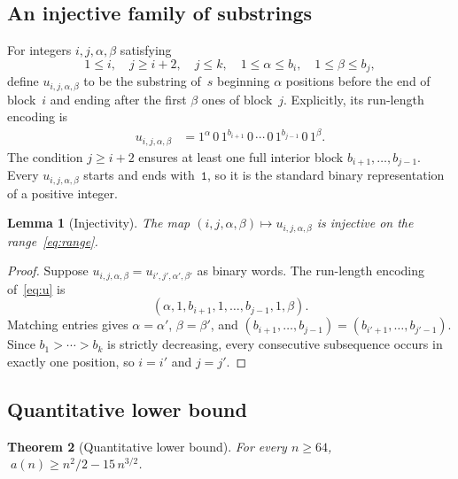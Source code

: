 \documentclass[11pt,a4paper]{article}
\theoremstyle{plain}
\newtheorem{theorem}{Theorem}[section]
\newtheorem{lemma}[theorem]{Lemma}
\theoremstyle{definition}
\theoremstyle{remark}
\begin{document}
\subsection{An injective family of substrings}

For integers $i, j, \alpha, \beta$ satisfying
\begin{equation}\label{eq:range}
  1 \le i, \quad j \ge i + 2, \quad j \le k, \quad
  1 \le \alpha \le b_i, \quad 1 \le \beta \le b_j,
\end{equation}
define $u_{i,j,\alpha,\beta}$ to be the substring of~$s$ beginning
$\alpha$ positions before the end of block~$i$ and ending after the
first $\beta$ ones of block~$j$.  Explicitly, its run-length encoding is
\begin{equation}\label{eq:u}
  \begin{aligned}
  u_{i,j,\alpha,\beta}
  &= 1^{\alpha}\,0\,1^{b_{i+1}}\,0\,\cdots\,0\,
     1^{b_{j-1}}\,0\,1^{\beta}.
  \end{aligned}
\end{equation}
The condition $j \ge i + 2$ ensures at least one full interior block
$b_{i+1},\ldots,b_{j-1}$.  Every $u_{i,j,\alpha,\beta}$ starts and
ends with~$\mathtt{1}$, so it is the standard binary representation of
a positive integer.

\begin{lemma}[Injectivity]\label{lem:inject}
  The map $(i,j,\alpha,\beta) \mapsto u_{i,j,\alpha,\beta}$ is
  injective on the range~\eqref{eq:range}.
\end{lemma}

\begin{proof}
  Suppose $u_{i,j,\alpha,\beta} = u_{i',j',\alpha',\beta'}$ as
  binary words.  The run-length encoding of~\eqref{eq:u} is
  \[
    (\alpha, 1, b_{i+1}, 1, \ldots, b_{j-1}, 1, \beta).
  \]
  Matching entries gives $\alpha = \alpha'$, $\beta = \beta'$, and
  $(b_{i+1},\ldots,b_{j-1}) = (b_{i'+1},\ldots,b_{j'-1})$.  Since
  $b_1 > \cdots > b_k$ is strictly decreasing, every consecutive
  subsequence occurs in exactly one position, so $i = i'$ and
  $j = j'$.
\end{proof}

\subsection{Quantitative lower bound}

\begin{theorem}[Quantitative lower bound]\label{thm:quant}
  For every $n \ge 64$,
  $\;a(n) \ge n^2/2 - 15\,n^{3/2}$.
\end{theorem}
\end{document}
